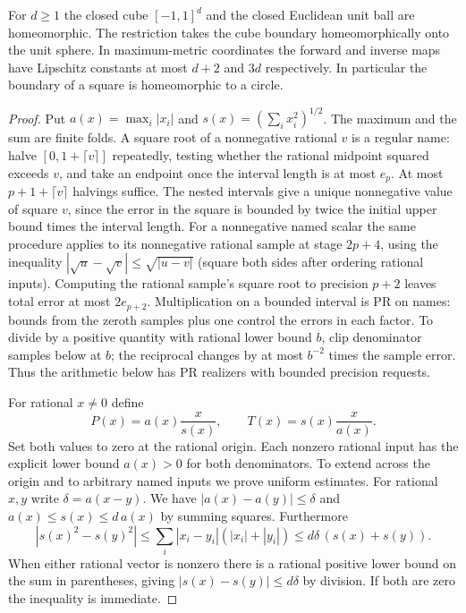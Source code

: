 \begin{theorem}\label{idx-metric350}
For $d\ge1$ the closed cube $[-1,1]^d$ and the closed Euclidean unit ball
are homeomorphic. The restriction takes the cube boundary homeomorphically
onto the unit sphere. In maximum-metric coordinates the forward and
inverse maps have Lipschitz constants at most $d+2$ and $3d$ respectively.
In particular the boundary of a square is homeomorphic to a circle.
\end{theorem}
\begin{proof}
Put $a(x)=\max_i|x_i|$ and $s(x)=(\sum_i x_i^2)^{1/2}$. The maximum and
the sum are finite folds. A square root of a nonnegative rational $v$ is a
regular name: halve $[0,1+\lceil v\rceil]$ repeatedly, testing whether
the rational midpoint squared exceeds $v$, and take an endpoint once the
interval length is at most $e_p$. At most $p+1+\lceil v\rceil$ halvings
suffice. The nested intervals give a unique nonnegative value of square $v$,
since the error in the square is bounded by twice the initial upper bound
times the interval length. For a nonnegative named scalar the same procedure
applies to its nonnegative rational sample at stage $2p+4$, using the
inequality $|\sqrt{u}-\sqrt{v}|\le\sqrt{|u-v|}$ (square both sides after
ordering rational inputs). Computing the rational sample's square root to
precision $p+2$ leaves total error at most $2e_{p+2}$.
Multiplication on a bounded interval is PR on names: bounds from the zeroth
samples plus one control the errors in each factor. To divide by a positive
quantity with rational lower bound $b$, clip denominator samples below at
$b$; the reciprocal changes by at most $b^{-2}$ times the sample error.
Thus the arithmetic below has PR realizers with bounded precision requests.

For rational $x\ne0$ define
\[
 P(x)=a(x)\frac{x}{s(x)},\qquad T(x)=s(x)\frac{x}{a(x)} .
\]
Set both values to zero at the rational origin. Each nonzero rational input
has the explicit lower bound $a(x)>0$ for both denominators. To extend
across the origin and to arbitrary named inputs we prove uniform estimates.
For rational $x,y$ write $\delta=a(x-y)$. We have
$|a(x)-a(y)|\le\delta$ and $a(x)\le s(x)\le d\,a(x)$ by summing squares.
Furthermore
\[
 |s(x)^2-s(y)^2|
 \le\sum_i|x_i-y_i|(|x_i|+|y_i|)
 \le d\delta\,(s(x)+s(y)).
\]
When either rational vector is nonzero there is a rational positive lower
bound on the sum in parentheses, giving $|s(x)-s(y)|\le d\delta$ by
division. If both are zero the inequality is immediate.


\end{proof}
